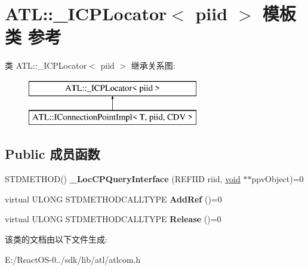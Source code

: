 \hypertarget{class_a_t_l_1_1___i_c_p_locator}{}\section{A\+TL\+:\+:\+\_\+\+I\+C\+P\+Locator$<$ piid $>$ 模板类 参考}
\label{class_a_t_l_1_1___i_c_p_locator}
类 A\+TL\+:\+:\+\_\+\+I\+C\+P\+Locator$<$ piid $>$ 继承关系图\+:\begin{figure}[H]
\begin{center}
\leavevmode
\includegraphics[height=2.000000cm]{class_a_t_l_1_1___i_c_p_locator}
\end{center}
\end{figure}
\subsection*{Public 成员函数}
\begin{DoxyCompactItemize}
\item 
\mbox{\label{class_a_t_l_1_1___i_c_p_locator_aa101e1ba181c074626092c3f09ee7315}} 
S\+T\+D\+M\+E\+T\+H\+OD() {\bfseries \+\_\+\+Loc\+C\+P\+Query\+Interface} (R\+E\+F\+I\+ID riid, \hyperlink{interfacevoid}{void} $\ast$$\ast$ppv\+Object)=0
\item 
\mbox{\label{class_a_t_l_1_1___i_c_p_locator_aec2d80fe41450a02d0d9702dca3ce0c4}} 
virtual U\+L\+O\+NG S\+T\+D\+M\+E\+T\+H\+O\+D\+C\+A\+L\+L\+T\+Y\+PE {\bfseries Add\+Ref} ()=0
\item 
\mbox{\label{class_a_t_l_1_1___i_c_p_locator_a692a363a5ecae0a807423db8a28a8588}} 
virtual U\+L\+O\+NG S\+T\+D\+M\+E\+T\+H\+O\+D\+C\+A\+L\+L\+T\+Y\+PE {\bfseries Release} ()=0
\end{DoxyCompactItemize}


该类的文档由以下文件生成\+:\begin{DoxyCompactItemize}
\item 
E\+:/\+React\+O\+S-\/0../sdk/lib/atl/atlcom.\+h\end{DoxyCompactItemize}
